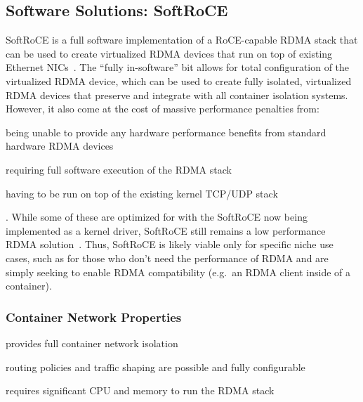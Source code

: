 \documentclass[12pt,titlepage]{article}
\begin{document}
%


\subsection{Software Solutions: SoftRoCE}
SoftRoCE is a full software implementation of a RoCE-capable RDMA stack that can be used to create virtualized RDMA devices that run on top of existing Ethernet NICs~\cite{softroceoverview}. 
The ``fully in-software'' bit allows for total configuration of the virtualized RDMA device, which can be used to create fully isolated, virtualized RDMA devices that preserve and integrate with all container isolation systems.
However, it also come at the cost of massive performance penalties from: 
\begin{enumerate*}[label={(\arabic*)},itemjoin*={{, and }},itemjoin={{, }}]
	\item being unable to provide any hardware performance benefits from standard hardware RDMA devices
	\item requiring full software execution of the RDMA stack
	\item having to be run on top of the existing kernel TCP/UDP stack
\end{enumerate*}.
While some of these are optimized for with the SoftRoCE now being implemented as a kernel driver, SoftRoCE still remains a low performance RDMA solution~\cite{softrocedriver}.
Thus, SoftRoCE is likely viable only for specific niche use cases, such as for those who don't need the performance of RDMA and are simply seeking to enable RDMA compatibility (e.g.\ an RDMA client inside of a container).

\subsubsection*{Container Network Properties}
\begin{description}[nolistsep,font={{\scshape\bfseries}}]
	\item[Network Isolation] provides full container network isolation
	\item[Controllability] routing policies and traffic shaping are possible and fully configurable
	\item[Resource Utilization] requires significant CPU and memory to run the RDMA stack
\end{description}
\end{document}
